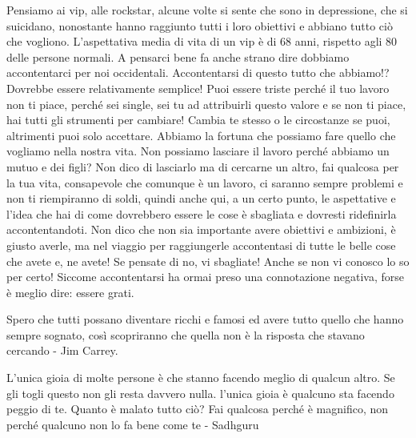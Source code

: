 \documentclass[12pt]{book} %
\begin{document}
Pensiamo ai vip, alle rockstar, alcune volte si sente che sono in depressione, che si suicidano, nonostante hanno
raggiunto tutti i loro obiettivi e abbiano tutto ciò che vogliono. L'aspettativa media di vita di un vip è
di 68 anni, rispetto agli 80 delle persone normali. A pensarci bene fa anche strano dire dobbiamo accontentarci per noi
occidentali. Accontentarsi di questo tutto che abbiamo!? Dovrebbe essere relativamente semplice! Puoi essere
triste perché il tuo lavoro non ti piace, perché sei single, sei tu ad attribuirli questo valore e se non ti piace, hai tutti gli strumenti per cambiare!
Cambia te stesso o le circostanze se puoi, altrimenti puoi solo accettare. Abbiamo la fortuna che possiamo fare
quello che vogliamo nella nostra vita. Non possiamo lasciare il lavoro perché abbiamo un mutuo e dei figli? Non dico di
lasciarlo ma di cercarne un altro, fai qualcosa per la tua vita, consapevole che comunque è un lavoro, ci saranno
sempre problemi e non ti riempiranno di soldi, quindi anche qui, a un certo punto, le aspettative e
l'idea che hai di come dovrebbero essere le cose è sbagliata e dovresti ridefinirla
accontentandoti. Non dico che non sia importante avere obiettivi e ambizioni, è giusto averle, ma nel viaggio per
raggiungerle accontentasi di tutte le belle cose che avete e, ne avete! Se pensate di no, vi sbagliate! Anche se non vi
conosco lo so per certo! Siccome accontentarsi ha ormai preso una connotazione negativa, forse è meglio dire: essere grati.

Spero che tutti possano diventare ricchi e famosi ed avere tutto quello che hanno sempre sognato, così scopriranno che
quella non è la risposta che stavano cercando - Jim Carrey.

L'unica gioia di molte persone è che stanno facendo meglio di qualcun altro. Se gli togli questo non gli resta davvero nulla. l'unica gioia è qualcuno sta facendo peggio di te. Quanto è malato tutto ciò? Fai qualcosa perché è magnifico, non perché qualcuno non lo fa bene come te - Sadhguru
\end{document}
